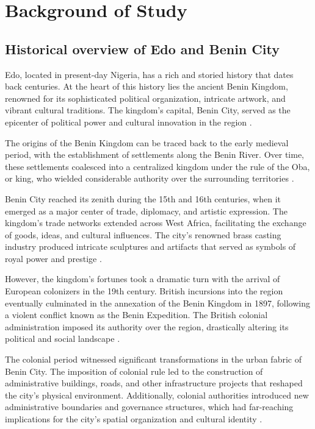 \chapter{Background of Study}
\section{Historical overview of Edo and Benin City}
Edo, located in present-day Nigeria, has a rich and storied history that dates back centuries. At the heart of this history lies the ancient Benin Kingdom, renowned for its sophisticated political organization, intricate artwork, and vibrant cultural traditions. The kingdom's capital, Benin City, served as the epicenter of political power and cultural innovation in the region \cite{egharevba1968short}.

The origins of the Benin Kingdom can be traced back to the early medieval period, with the establishment of settlements along the Benin River. Over time, these settlements coalesced into a centralized kingdom under the rule of the Oba, or king, who wielded considerable authority over the surrounding territories \cite{egharevba1968short}.


Benin City reached its zenith during the 15th and 16th centuries, when it emerged as a major center of trade, diplomacy, and artistic expression. The kingdom's trade networks extended across West Africa, facilitating the exchange of goods, ideas, and cultural influences. The city's renowned brass casting industry produced intricate sculptures and artifacts that served as symbols of royal power and prestige \cite{egharevba1968short}.


However, the kingdom's fortunes took a dramatic turn with the arrival of European colonizers in the 19th century. British incursions into the region eventually culminated in the annexation of the Benin Kingdom in 1897, following a violent conflict known as the Benin Expedition. The British colonial administration imposed its authority over the region, drastically altering its political and social landscape \cite{egharevba1968short}.


The colonial period witnessed significant transformations in the urban fabric of Benin City. The imposition of colonial rule led to the construction of administrative buildings, roads, and other infrastructure projects that reshaped the city's physical environment. Additionally, colonial authorities introduced new administrative boundaries and governance structures, which had far-reaching implications for the city's spatial organization and cultural identity \cite{falola2006works}.


